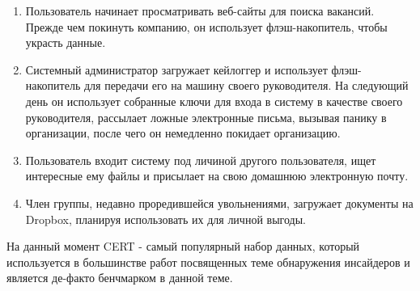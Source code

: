 \begin{itemize}
\begin{enumerate}
	\item Пользователь начинает просматривать веб-сайты для поиска вакансий. Прежде чем покинуть компанию, он использует флэш-накопитель, чтобы украсть данные.\\
	\item Системный администратор загружает кейлоггер и использует флэш-накопитель для передачи его на машину своего руководителя. На следующий день он использует собранные ключи для входа в систему в качестве своего руководителя, рассылает ложные электронные письма, вызывая панику в организации, после чего он немедленно покидает организацию.\\
	\item Пользователь входит систему под личиной другого пользователя, ищет интересные ему файлы и присылает на свою домашнюю электронную почту.\\
	\item Член группы, недавно проредившейся увольнениями, загружает документы на Dropbox, планируя использовать их для личной выгоды.\\
\end{enumerate}
На данный момент CERT - самый популярный набор данных, который используется в большинстве работ посвященных теме обнаружения инсайдеров и является де-факто бенчмарком в данной теме.\\


\end{itemize}

